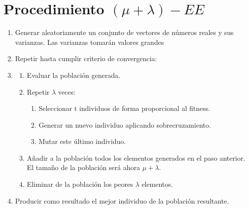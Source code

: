 \documentclass[12pt, twoside, openright]{report} %
\begin{document}
\section{Procedimiento $(\mu + \lambda)-EE$}
\begin{enumerate}
	\item Generar aleatoriamente un conjunto de vectores de números reales y sus varianzas. Las varianzas tomarán valores grandes
	\item Repetir hasta cumplir criterio de convergencia:
	\item \begin{enumerate}
		\item Evaluar la población generada.
		\item Repetir $\lambda$ veces:
		\begin{enumerate}
			\item Seleccionar t individuos de forma proporcional al fitness.
			\item Generar un nuevo individuo aplicando sobrecruzamiento.
			\item Mutar este último individuo.
		\end{enumerate}
		\item Añadir a la población todos los elementos generados en el paso anterior. El tamaño de la población será ahora $\mu + \lambda$.
		\item Eliminar de la población los peores $\lambda$ elementos.
	\end{enumerate}
	\item Producir como resultado el mejor individuo de la población resultante.
\end{enumerate}
\end{document}
